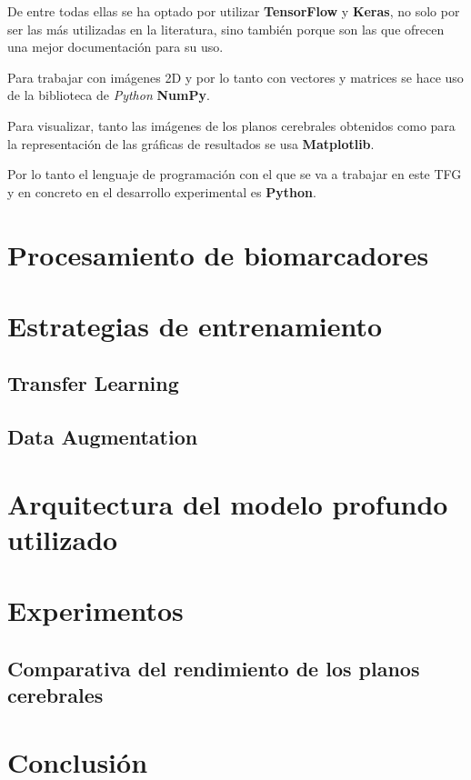 De entre todas ellas se ha optado por utilizar \textbf{TensorFlow} y \textbf{Keras}, no solo por ser las más utilizadas
en la literatura, sino también porque son las que ofrecen una mejor documentación para su uso.

Para trabajar con imágenes 2D y por lo tanto con vectores y matrices se hace uso de la biblioteca de \textit{Python}
\textbf{NumPy}.

Para visualizar, tanto las imágenes de los planos cerebrales obtenidos como para la representación de las gráficas de
resultados se usa \textbf{Matplotlib}.

Por lo tanto el lenguaje de programación con el que se va a trabajar en este TFG y en concreto en el desarrollo
experimental es \textbf{Python}.

\section{Procesamiento de biomarcadores}

\section{Estrategias de entrenamiento}
\subsection{Transfer Learning}
\subsection{Data Augmentation}

\section{Arquitectura del modelo profundo utilizado}

\section{Experimentos}
\subsection{Comparativa del rendimiento de los planos cerebrales}

\section{Conclusión}
